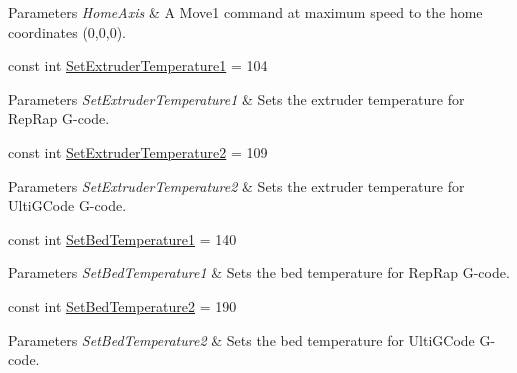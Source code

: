 \begin{DoxyCompactItemize}
\begin{DoxyCompactList}
\begin{DoxyParams}{Parameters}
{\em Home\+Axis} & A Move1 command at maximum speed to the home coordinates (0,0,0).\\
\hline
\end{DoxyParams}
\end{DoxyCompactList}\item 
\mbox{\label{class_g_mcodes_aef9ced59d2c0feef2ec1caafd1a3d6f3}} 
const int \hyperlink{class_g_mcodes_aef9ced59d2c0feef2ec1caafd1a3d6f3}{Set\+Extruder\+Temperature1} = 104
\begin{DoxyCompactList}\small\item\em 
\begin{DoxyParams}{Parameters}
{\em Set\+Extruder\+Temperature1} & Sets the extruder temperature for Rep\+Rap G-\/code.\\
\hline
\end{DoxyParams}
\end{DoxyCompactList}\item 
\mbox{\label{class_g_mcodes_af52a427822185c005317834f84f351b9}} 
const int \hyperlink{class_g_mcodes_af52a427822185c005317834f84f351b9}{Set\+Extruder\+Temperature2} = 109
\begin{DoxyCompactList}\small\item\em 
\begin{DoxyParams}{Parameters}
{\em Set\+Extruder\+Temperature2} & Sets the extruder temperature for Ulti\+G\+Code G-\/code.\\
\hline
\end{DoxyParams}
\end{DoxyCompactList}\item 
\mbox{\label{class_g_mcodes_ada9741115088ea15e37ae8eda2fa8d9e}} 
const int \hyperlink{class_g_mcodes_ada9741115088ea15e37ae8eda2fa8d9e}{Set\+Bed\+Temperature1} = 140
\begin{DoxyCompactList}\small\item\em 
\begin{DoxyParams}{Parameters}
{\em Set\+Bed\+Temperature1} & Sets the bed temperature for Rep\+Rap G-\/code.\\
\hline
\end{DoxyParams}
\end{DoxyCompactList}\item 
\mbox{\label{class_g_mcodes_ad64aba8e5361df2deb1a660988f0c4dc}} 
const int \hyperlink{class_g_mcodes_ad64aba8e5361df2deb1a660988f0c4dc}{Set\+Bed\+Temperature2} = 190
\begin{DoxyCompactList}\small\item\em 
\begin{DoxyParams}{Parameters}
{\em Set\+Bed\+Temperature2} & Sets the bed temperature for Ulti\+G\+Code G-\/code.\\
\hline
\end{DoxyParams}
\end{DoxyCompactList}\end{DoxyCompactItemize}


